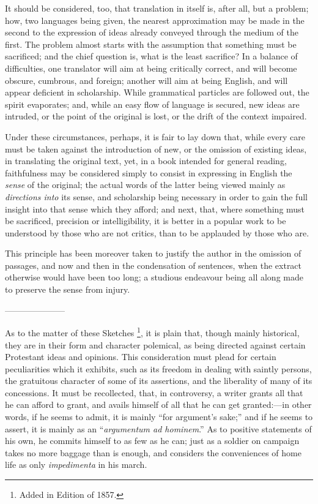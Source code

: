 It should be considered, too, that translation in itself is, after
all, but a problem; how, two languages being given, the nearest
approximation may be made in the second to the expression of ideas
already conveyed through the medium of the first. The problem almost
starts with the assumption that something must be sacrificed; and the
chief question is, what is the least sacrifice? In a balance of
difficulties, one translator will aim at being critically correct, and
will become obscure, cumbrous, and foreign; another will aim at being
English, and will appear deficient in scholarship. While grammatical
particles are followed out, the spirit evaporates; and, while an
easy flow of language is secured, new ideas are intruded, or the point
of the original is lost, or the drift of the context impaired.

Under these circumstances, perhaps, it is fair to lay down that,
while every care must be taken against the introduction of new, or the
omission of existing ideas, in translating the original text, yet, in
a book intended for general reading, faithfulness may be considered
simply to consist in expressing in English the \emph{sense} of the
original; the actual words of the latter being viewed mainly as \emph{directions
into} its sense, and scholarship being necessary in order to gain
the full insight into that sense which they afford; and next, that,
where something must be sacrificed, precision or intelligibility, it
is better in a popular work to be understood by those who are not
critics, than to be applauded by those who are.

This principle has been moreover taken to justify the author in the
omission of passages, and now and then in the condensation of
sentences, when the extract otherwise would have been too long; a
studious endeavour being all along made to preserve the sense from
injury.

———————

As to the matter of these Sketches \footnote{Added in Edition of 1857.},
it is plain that, though mainly historical, they are in their form and
character polemical, as being directed against certain Protestant
ideas and opinions. This consideration must plead for certain
peculiarities which it exhibits, such as its freedom in dealing with
saintly persons, the gratuitous character of some of its assertions,
and the liberality of many of its concessions. It must be recollected,
that, in controversy, a writer grants all that he can afford to grant,
and avails himself of all that he can get granted:—in other words,
if he seems to admit, it is mainly ``for argument's sake;''
and if he seems to assert, it is mainly as an ``\emph{argumentum ad
hominem}.'' As to positive statements of his own, he commits
himself to as few as he can; just as a soldier on campaign takes no
more baggage than is enough, and considers the conveniences of home
life as only \emph{impedimenta} in his march.

